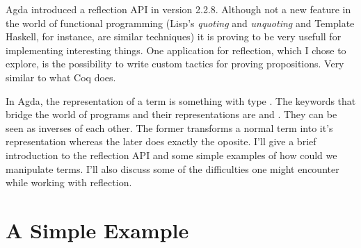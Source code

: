 
Agda introduced a reflection API in version 2.2.8. Although not a new feature
in the world of functional programming (Lisp's \emph{quoting} and \emph{unquoting} and Template Haskell, for instance, are similar techniques) 
it is proving to be very usefull for implementing interesting things. One application for reflection, which I chose to explore, is the possibility to write
custom tactics for proving propositions. Very similar to what Coq does.

In Agda, the representation of a term is something with type .
The keywords that bridge the world of programs and their representations are  and . They can be seen as inverses of each other. The former transforms a
normal term into it's  representation whereas the later does exactly the oposite. I'll give a brief introduction to the reflection API and
some simple examples of how could we manipulate terms. I'll also discuss some
of the difficulties one might encounter while working with reflection.

\section{A Simple Example}

